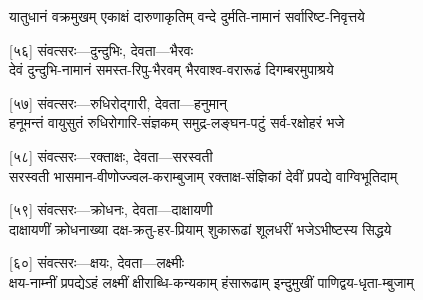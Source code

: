 \twolineshloka
{यातुधानं वक्रमुखम् एकाक्षं दारुणाकृतिम्}
{वन्दे दुर्मति-नामानं सर्वारिष्ट-निवृत्तये} %

[५६] संवत्सरः—दुन्दुभिः, देवता—भैरवः\\

\twolineshloka
{देवं दुन्दुभि-नामानं समस्त-रिपु-भैरवम्}
{भैरवाश्व-वरारूढं दिगम्बरमुपाश्रये} %

[५७] संवत्सरः—रुधिरोद्गारी, देवता—हनुमान्\\

\twolineshloka
{हनूमन्तं वायुसुतं रुधिरोगारि-संज्ञकम्}
{समुद्र-लङ्घन-पटुं सर्व-रक्षोहरं भजे} %

[५८] संवत्सरः—रक्ताक्षः, देवता—सरस्वती\\

\twolineshloka
{सरस्वती भासमान-वीणोज्ज्वल-कराम्बुजाम्}
{रक्ताक्ष-संज्ञिकां देवीं प्रपद्ये वाग्विभूतिदाम्} %

[५९] संवत्सरः—क्रोधनः, देवता—दाक्षायणी\\

\twolineshloka
{दाक्षायणीं क्रोधनाख्या दक्ष-क्रतु-हर-प्रियाम्}
{शुकारूढां शूलधरीं भजेऽभीष्टस्य सिद्धये} %

[६०] संवत्सरः—क्षयः, देवता—लक्ष्मीः\\

\twolineshloka
{क्षय-नाम्नीं प्रपद्येऽहं लक्ष्मीं क्षीराब्धि-कन्यकाम्}
{हंसारूढाम् इन्दुमुखीं पाणिद्वय-धृता-म्बुजाम्} %
